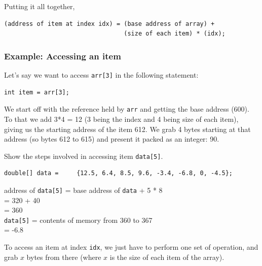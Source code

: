 Putting it all together,

\begin{verbatim}
(address of item at index idx) = (base address of array) + 
                                 (size of each item) * (idx);
\end{verbatim}

\subsubsection{Example: Accessing an item}

Let's say we want to access \texttt{arr[3]} in the following statement:

\begin{lstlisting}
int item = arr[3];
\end{lstlisting}

We start off with the reference held by \texttt{arr} and getting the base address (600). To that we add 3*4 = 12 (3 being the index and 4 being size of each item), giving us the starting address of the item 612. We grab 4 bytes starting at that address (so bytes 612 to 615) and present it packed as an integer: 90.

\begin{exercise}
Show the steps involved in accessing item \texttt{data[5]}.

\vskip 0.5cm
\begin{lstlisting}
double[] data = 	{12.5, 6.4, 8.5, 9.6, -3.4, -6.8, 0, -4.5};
\end{lstlisting}

\newline
\end{exercise}
\begin{answer}
address of \texttt{data[5]} = base address of \texttt{data} + 5 * 8\\
= 320 + 40 \\
= 360\\

\texttt{data[5]} = contents of memory from 360 to 367 \\
= -6.8	
\end{answer}

To access an item at index \texttt{idx}, we just have to perform one set of operation, and grab $x$ bytes from there (where $x$ is the size of each item of the array). 

